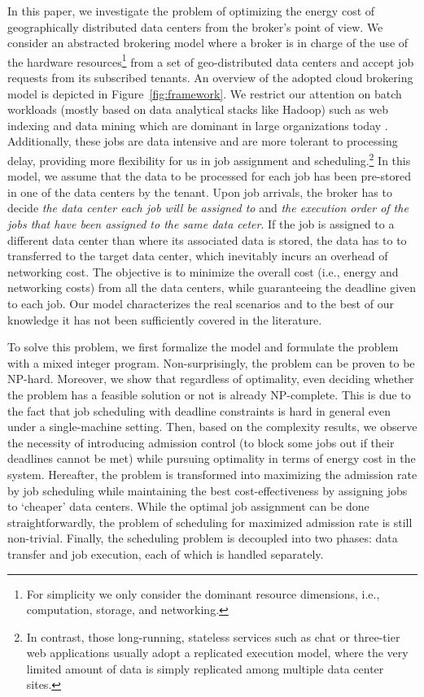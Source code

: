 \documentclass{article}
\begin{document}
In this paper, we investigate the problem of optimizing the energy cost of geographically distributed data centers from the broker's point of view. We consider an abstracted brokering model where a broker is in charge of the use of the hardware resources\footnote{For simplicity we only consider the dominant resource dimensions, i.e., computation, storage, and networking.} from a set of geo-distributed data centers and accept job requests from its subscribed tenants. An overview of the adopted cloud brokering model is depicted in Figure~\ref{fig:framework}. We restrict our attention on batch workloads (mostly based on data analytical stacks like Hadoop) such as web indexing and data mining which are dominant in large organizations today \cite{Facebook-data}. Additionally, these jobs are data intensive and are more tolerant to processing delay, providing more flexibility for us in job assignment and scheduling.\footnote{In contrast, those long-running, stateless services such as chat or three-tier web applications usually adopt a replicated execution model, where the very limited amount of data is simply replicated among multiple data center sites.} In this model, we assume that the data to be processed for each job has been pre-stored in one of the data centers by the tenant. Upon job arrivals, the broker has to decide \textit{the data center each job will be assigned to} and \textit{the execution order of the jobs that have been assigned to the same data ceter}. If the job is assigned to a different data center than where its associated data is stored, the data has to to transferred to the target data center, which inevitably incurs an overhead of networking cost. The objective is to minimize the overall cost (i.e., energy and networking costs) from all the data centers, while guaranteeing the deadline given to each job. Our model characterizes the real scenarios and to the best of our knowledge it has not been sufficiently covered in the literature.

To solve this problem, we first formalize the model and formulate the problem with a mixed integer program. Non-surprisingly, the problem can be proven to be NP-hard. Moreover, we show that regardless of optimality, even deciding whether the problem has a feasible solution or not is already NP-complete. This is due to the fact that job scheduling with deadline constraints is hard in general even under a single-machine setting. Then, based on the complexity results, we observe the necessity of introducing admission control (to block some jobs out if their deadlines cannot be met) while pursuing optimality in terms of energy cost in the system. Hereafter, the problem is transformed into maximizing the admission rate by job scheduling while maintaining the best cost-effectiveness by assigning jobs to `cheaper' data centers. While the optimal job assignment can be done straightforwardly, the problem of scheduling for maximized admission rate is still non-trivial. Finally, the scheduling problem is decoupled into two phases: data transfer and job execution, each of which is handled separately.
\end{document}
